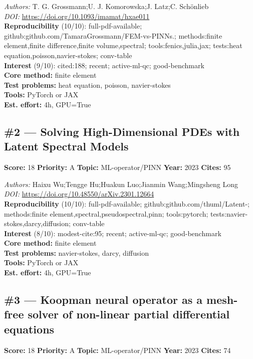 \documentclass[10pt,letterpaper]{article}
\begin{document}
\textit{Authors:} T. G. Grossmann;U. J. Komorowska;J. Latz;C. Schönlieb \\ 
\textit{DOI:} \url{https://doi.org/10.1093/imamat/hxae011} \\ 
\textbf{Reproducibility } (10/10): full-pdf-available; github:github.com/TamaraGrossmann/FEM-vs-PINNs.; methods:finite element,finite difference,finite volume,spectral; tools:fenics,julia,jax; tests:heat equation,poisson,navier-stokes; conv-table \\ 
\textbf{Interest } (9/10): cited:188; recent; active-ml-qc; good-benchmark \\ 
\textbf{Core method:} finite element \\ 
\textbf{Test problems:} heat equation, poisson, navier-stokes \\ 
\textbf{Tools:} PyTorch or JAX \\ 
\textbf{Est. effort:} 4h, GPU=True \\ 

\subsection*{\#2 — Solving High-Dimensional PDEs with Latent Spectral Models}
\textbf{Score:} 18 \quad \textbf{Priority:} A \quad \textbf{Topic:} ML-operator/PINN \quad \textbf{Year:} 2023 \quad \textbf{Cites:} 95

\textit{Authors:} Haixu Wu;Tengge Hu;Huakun Luo;Jianmin Wang;Mingsheng Long \\ 
\textit{DOI:} \url{https://doi.org/10.48550/arXiv.2301.12664} \\ 
\textbf{Reproducibility } (10/10): full-pdf-available; github:github.com/thuml/Latent-; methods:finite element,spectral,pseudospectral,pinn; tools:pytorch; tests:navier-stokes,darcy,diffusion; conv-table \\ 
\textbf{Interest } (8/10): modest-cite:95; recent; active-ml-qc; good-benchmark \\ 
\textbf{Core method:} finite element \\ 
\textbf{Test problems:} navier-stokes, darcy, diffusion \\ 
\textbf{Tools:} PyTorch or JAX \\ 
\textbf{Est. effort:} 4h, GPU=True \\ 

\subsection*{\#3 — Koopman neural operator as a mesh-free solver of non-linear partial differential equations}
\textbf{Score:} 18 \quad \textbf{Priority:} A \quad \textbf{Topic:} ML-operator/PINN \quad \textbf{Year:} 2023 \quad \textbf{Cites:} 74
\end{document}
